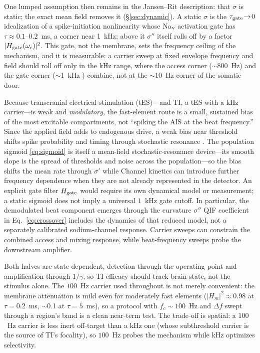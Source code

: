 \documentclass[11pt,a4paper]{article}
\newcommand{\Sig}{\sigma}
\providecommand{\DIFaddtex}[1]{{\protect\color{blue} \sf #1}} %
\providecommand{\DIFdeltex}[1]{{\protect\color{red} \scriptsize #1}} %
\providecommand{\DIFaddbegin}{} %
\providecommand{\DIFaddend}{} %
\providecommand{\DIFdelbegin}{} %
\providecommand{\DIFdelend}{} %
\providecommand{\DIFadd}[1]{\texorpdfstring{\DIFaddtex{#1}}{#1}} %
\providecommand{\DIFdel}[1]{\texorpdfstring{\DIFdeltex{#1}}{}} %
\begin{document}
\DIFdelbegin \DIFdel{One lumped assumption then remains in the Jansen--Rit description: that $\Sig$ is
static; the exact mean field removes it (\S\ref{sec:dynamic}). A static $\Sig$ is the
$\tau_{\rm gate}\!\to\!0$ idealization of a spike-initiation nonlinearity whose Na$_{\rm v}$ activation
gate has $\tau\!\approx\!0.1$--$0.2$~ms, a corner near 1~kHz; above it $\Sig''$ itself rolls off by a factor $|H_{\rm gate}(\omega_c)|^2$. This gate, not
the membrane, sets the frequency ceiling of the
mechanism, and it is measurable: a carrier sweep at fixed envelope frequency and field should roll
off only in the kHz range, where the access corner ($\sim$800~Hz) and the gate corner ($\sim$1~kHz )
combine, not at the $\sim$10~Hz corner of the somatic door.
}%

\DIFdel{Because transcranial electrical stimulation (tES)---and TI, a tES with a kHz carrier---is weak and \emph{modulatory}, the
fast-element route is a small, sustained bias of the most excitable compartments, not ``spiking the AIS at the beat frequency.'' Since the applied field adds to endogenous
drive, a
weak bias near threshold shifts spike probability and timing through
stochastic resonance \cite{reato2010,liu2018}. The population sigmoid \eqref{eq:sigmoid}
is itself a mean-field stochastic-resonance device---its smooth slope is the
spread of
thresholds and noise across the population---so the bias shifts the mean rate through
$\Sig'$ while }\DIFdelend \DIFaddbegin \DIFadd{Channel kinetics can introduce further frequency dependence when they are not
already represented in the detector. An explicit gate filter $H_{\rm gate}$
would require its own dynamical model or measurement; a static sigmoid does not
imply a universal $1$~kHz gate cutoff. In particular, }\DIFaddend the \DIFdelbegin \DIFdel{demodulated beat component emerges through the curvature $\Sig''$}\DIFdelend \DIFaddbegin \DIFadd{QIF coefficient in
Eq.~\eqref{eq:crossover} includes the dynamics of that reduced model, not a
separately calibrated sodium-channel response. Carrier sweeps can constrain the
combined access and mixing response, while beat-frequency sweeps probe the
downstream amplifier}\DIFaddend .

\DIFdelbegin \DIFdel{Both halves are state-dependent, detection through the operating point and
amplification through $1/\gamma$, so TI efficacy should track brain state, not the
stimulus alone. The $100$~Hz carrier used throughout
is not merely convenient: the membrane attenuation is mild even for moderately fast
elements ($|H_m|^2\!\approx\!0.98$ at $\tau=0.2$~ms, $\sim$0.1 at $\tau=5$~ms), so a
protocol with $f_c\!\sim\!100$~Hz and $\Delta f$ swept through a region's band is a clean
near-term test. The trade-off is spatial: a $100$~Hz carrier is less inert off-target
than a kHz one (whose subthreshold carrier is the source of TI's focality), so $100$~Hz
probes the mechanism while kHz optimizes selectivity.
}%
\end{document}
